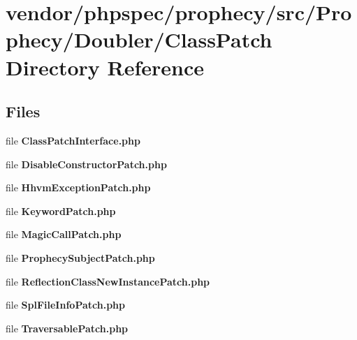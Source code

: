 \section{vendor/phpspec/prophecy/src/\+Prophecy/\+Doubler/\+Class\+Patch Directory Reference}
\label{dir_67bd15b26bdb357aa6272c92d1ad5039}
\subsection*{Files}
\begin{DoxyCompactItemize}
\item 
file {\bf Class\+Patch\+Interface.\+php}
\item 
file {\bf Disable\+Constructor\+Patch.\+php}
\item 
file {\bf Hhvm\+Exception\+Patch.\+php}
\item 
file {\bf Keyword\+Patch.\+php}
\item 
file {\bf Magic\+Call\+Patch.\+php}
\item 
file {\bf Prophecy\+Subject\+Patch.\+php}
\item 
file {\bf Reflection\+Class\+New\+Instance\+Patch.\+php}
\item 
file {\bf Spl\+File\+Info\+Patch.\+php}
\item 
file {\bf Traversable\+Patch.\+php}
\end{DoxyCompactItemize}
